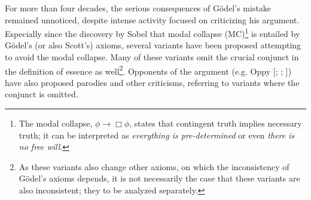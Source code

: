 \documentclass{article}
\begin{document}
For more than four decades, the serious consequences of G\"odel's
mistake remained unnoticed, despite intense activity focused on
criticizing his argument. Especially since the discovery by Sobel
 that modal collapse (MC)\footnote{The modal collapse,
  $\phi\rightarrow \Box \phi$, states that contingent truth implies
  necessary truth; it can be interpreted as \textit{everything is
    pre-determined} or even \textit{there is no free will}. } is
entailed by G\"odel's (or also Scott's) axioms, several variants have
been proposed
\cite{Anderson,AndersonGettings,Hajek1,Hajek2,Hajek3,Bjordal}
attempting to avoid the modal collapse. Many of these variants omit
the crucial conjunct in the definition of essence as well\footnote{As
  these variants also change other axioms, on which the inconsistency
  of G\"odel's axioms depends, it is not necessarily the case that
  these variants are also inconsistent; they to be analyzed
  separately.}. Opponents of the argument
(e.g. Oppy [\citeyear[p.226--227]{oppy96:_goedel_ontol_argum};
\citeyear[p.364]{oppy00:_respon_gettin};
\citeyear[p.1068]{oppy08:_higher_order_ontol_argum}]) have also proposed
parodies and other criticisms, referring to variants where the
conjunct is omitted.






\end{document}
